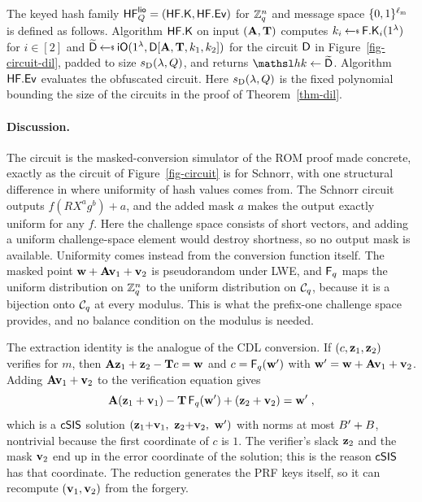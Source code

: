 \begin{construction} \label{constr-dil-hash}
The keyed hash family $\mathsf{HF}^{\mathsf{lio}}_Q = (\mathsf{HF}.\mathsf{K}, \mathsf{HF}.\mathsf{Ev})$ for $\mathbb{Z}_q^n$ and message space $\{0,1\}^{\ell_{\mathrm{m}}}$ is defined as follows. Algorithm $\mathsf{HF}.\mathsf{K}$ on input $(\mathbf{A}, \mathbf{T})$ computes $k_i \getsr \PRFKg_i(\usecp)$ for $i \in [2]$ and $\widetilde{\CircD} \getsr \iO(\usecp, \CircD[\mat{A}, \mat{T}, k_1, k_2])$ for the circuit $\mathsf{D}$ in Figure~\ref{fig-circuit-dil}, padded to size $s_{\mathrm{D}}(\lambda, Q)$, and returns $\hk \gets \widetilde{\CircD}$. Algorithm $\mathsf{HF}.\mathsf{Ev}$ evaluates the obfuscated circuit. Here $s_{\mathrm{D}}(\lambda, Q)$ is the fixed polynomial bounding the size of the circuits in the proof of Theorem~\ref{thm-dil}.
\end{construction}

\paragraph*{Discussion.} The circuit is the masked-conversion simulator of the ROM proof made concrete, exactly as the circuit of Figure~\ref{fig-circuit} is for Schnorr, with one structural difference in where uniformity of hash values comes from. The Schnorr circuit outputs $f(R X^a g^b) + a$, and the added mask $a$ makes the output exactly uniform for any $f$. Here the challenge space consists of short vectors, and adding a uniform challenge-space element would destroy shortness, so no output mask is available. Uniformity comes instead from the conversion function itself. The masked point $\mathbf{w} + \mathbf{A}\mathbf{v}_1 + \mathbf{v}_2$ is pseudorandom under LWE, and $\mathsf{F}_q$ maps the uniform distribution on $\mathbb{Z}_q^n$ to the uniform distribution on $\mathcal{C}_q$, because it is a bijection onto $\mathcal{C}_q$ at every modulus. This is what the prefix-one challenge space provides, and no balance condition on the modulus is needed.

The extraction identity is the analogue of the CDL conversion. If $(c, \mathbf{z}_1, \mathbf{z}_2)$ verifies for $m$, then $\mathbf{A}\mathbf{z}_1 + \mathbf{z}_2 - \mathbf{T}c = \mathbf{w}$ and $c = \mathsf{F}_q(\mathbf{w}')$ with $\mathbf{w}' = \mathbf{w} + \mathbf{A}\mathbf{v}_1 + \mathbf{v}_2$. Adding $\mathbf{A}\mathbf{v}_1 + \mathbf{v}_2$ to the verification equation gives
$$
\mathbf{A}(\mathbf{z}_1 + \mathbf{v}_1) - \mathbf{T}\,\mathsf{F}_q(\mathbf{w}') + (\mathbf{z}_2 + \mathbf{v}_2) = \mathbf{w}' \;,
$$
which is a $\mathsf{cSIS}$ solution $(\mat{z}_1{+}\mat{v}_1,\ \mat{z}_2{+}\mat{v}_2,\ \mat{w}')$ with norms at most $B' + B$, nontrivial because the first coordinate of $c$ is $1$. The verifier's slack $\mathbf{z}_2$ and the mask $\mathbf{v}_2$ end up in the error coordinate of the solution; this is the reason $\mathsf{cSIS}$ has that coordinate. The reduction generates the PRF keys itself, so it can recompute $(\mathbf{v}_1, \mathbf{v}_2)$ from the forgery.

